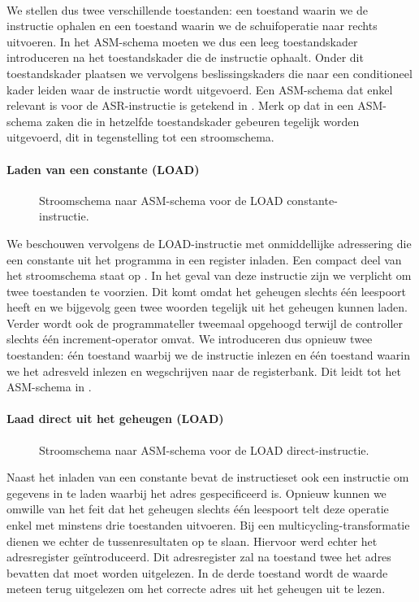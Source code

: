 \paragraph{}
We stellen dus twee verschillende toestanden: een toestand waarin we de instructie ophalen en een toestand waarin we de schuifoperatie naar rechts uitvoeren. In het ASM-schema moeten we dus een leeg toestandskader introduceren na het toestandskader die de instructie ophaalt. Onder dit toestandskader plaatsen we vervolgens beslissingskaders die naar een conditioneel kader leiden waar de instructie wordt uitgevoerd. Een ASM-schema dat enkel relevant is voor de ASR-instructie is getekend in . Merk op dat in een ASM-schema zaken die in hetzelfde toestandskader gebeuren tegelijk worden uitgevoerd, dit in tegenstelling tot een stroomschema.
\paragraph{Laden van een constante (LOAD)}
\begin{figure}[hbt]
\centering
{}
\caption{Stroomschema naar ASM-schema voor de LOAD constante-instructie.}
\label{flowasm-load1}
\end{figure}
We beschouwen vervolgens de LOAD-instructie met onmiddellijke adressering die een constante uit het programma in een register inladen. Een compact deel van het stroomschema staat op . In het geval van deze instructie zijn we verplicht om twee toestanden te voorzien. Dit komt omdat het geheugen slechts \'e\'en leespoort heeft en we bijgevolg geen twee woorden tegelijk uit het geheugen kunnen laden. Verder wordt ook de programmateller tweemaal opgehoogd terwijl de controller slechts \'e\'en increment-operator omvat. We introduceren dus opnieuw twee toestanden: \'e\'en toestand waarbij we de instructie inlezen en \'e\'en toestand waarin we het adresveld inlezen en wegschrijven naar de registerbank. Dit leidt tot het ASM-schema in .
\paragraph{Laad direct uit het geheugen (LOAD)}
\begin{figure}[hbt]
\centering
{}
\caption{Stroomschema naar ASM-schema voor de LOAD direct-instructie.}
\label{flowasm-load2}
\end{figure}
Naast het inladen van een constante bevat de instructieset ook een instructie om gegevens in te laden waarbij het adres gespecificeerd is. Opnieuw kunnen we omwille van het feit dat het geheugen slechts \'e\'en leespoort telt deze operatie enkel met minstens drie toestanden uitvoeren. Bij een multicycling-transformatie dienen we echter de tussenresultaten op te slaan. Hiervoor werd echter het adresregister ge\"introduceerd. Dit adresregister zal na toestand twee het adres bevatten dat moet worden uitgelezen. In de derde toestand wordt de waarde meteen terug uitgelezen om het correcte adres uit het geheugen uit te lezen.
